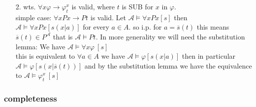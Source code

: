 {\begin{enumerate}
\begin{enumerate}
\begin{claimproof}
                Induction on terms.
            \end{claimproof}
            \begin{itemize}
                \item $\alpha$ of the form $t_1 = t_2$ then $\alpha'$ is $t_1' =t_2'$, use prev. claim.
                \item $\alpha$ of the form $P t_1 \dots t_n$ similar
            \end{itemize}
            \item[2.] wts. $\forall x \varphi \to \varphi^x_t$ is valid, where $t$ is SUB for $x$ in $\varphi$.\\
            simple case: $\forall x Px \to Pt$ is valid.
            Let $\mathcal{A}\models \forall x P x [s]$ then $\mathcal{A}\models \forall x P x [s(x|a)]$ for every $a\in A$. so i.p. for $a = \overline{s}(t)$
            this means $\overline{s}(t)\in P^\mathcal{A}$ that is $\mathcal{A}\models Pt$.
            In more generality we will need the substitution lemma:
            We have $\mathcal{A} \models \forall x \varphi \: [s]$\\
            this is equivalent to $\forall a \in A$ we have $\mathcal{A}\models \varphi [s(x|a)]$ 
            then in particular $\mathcal{A}\models \varphi [s(x|\overline{s}(t))]$ and
            by the substitution lemma we have the equivalence to $\mathcal{A}\models \varphi^x_t\:[s]$
        \end{enumerate}
    \end{enumerate}
}



\subsubsection{completeness}


